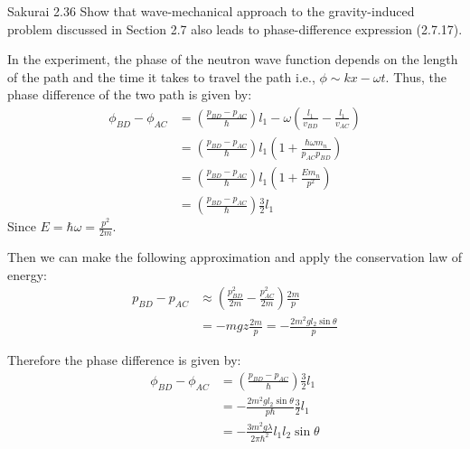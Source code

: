 \documentclass{article}
\begin{document}
\newpage
\begin{section}{Sakurai 2.36}
Show that wave-mechanical approach to the gravity-induced problem discussed in Section 2.7 also leads to phase-difference expression (2.7.17).

\begin{tcolorbox}
	In the experiment, the phase of the neutron wave function depends on the length of the path and the time it takes to travel the path i.e., $\phi \sim kx - \omega t$. Thus, the phase difference of the two path is given by:
	\begin{align*}
		\phi_{BD} - \phi_{AC}
		 & = \left( \frac{p_{BD} - p_{AC}}{\hbar} \right) l_1 - \omega \left(\frac{l_1}{v_{BD}} - \frac{l_1}{v_{AC}}\right) \\
		 & = \left( \frac{p_{BD} - p_{AC}}{\hbar} \right) l_1 \left( 1 + \frac{\hbar\omega m_n}{p_{AC}p_{BD}} \right)       \\
		 & = \left( \frac{p_{BD} - p_{AC}}{\hbar} \right) l_1 \left( 1 + \frac{E m_n}{p^2} \right)                          \\
		 & = \left( \frac{p_{BD} - p_{AC}}{\hbar} \right) \frac{3}{2} l_1
	\end{align*}
	Since $E = \hbar \omega = \frac{p^2}{2m}$.

	Then we can make the following approximation and apply the conservation law of energy:
	\begin{align*}
		p_{BD} - p_{AC} & \approx \left( \frac{p_{BD}^2}{2m} - \frac{p_{AC}^2}{2m} \right) \frac{2m}{p} \\
		                & = -mgz \frac{2m}{p} = -\frac{2m^2gl_2 \sin\theta}{p}
	\end{align*}

	Therefore the phase difference is given by:
	\begin{align*}
		\phi_{BD} - \phi_{AC}
		 & = \left( \frac{p_{BD} - p_{AC}}{\hbar} \right) \frac{3}{2} l_1 \\
		 & = -\frac{2m^2gl_2 \sin\theta}{p\hbar} \frac{3}{2} l_1          \\
		 & = -\frac{3m^2g \lambda}{2\pi \hbar^2} l_1l_2 \sin\theta
	\end{align*}

\end{tcolorbox}
\end{section}
\end{document}
